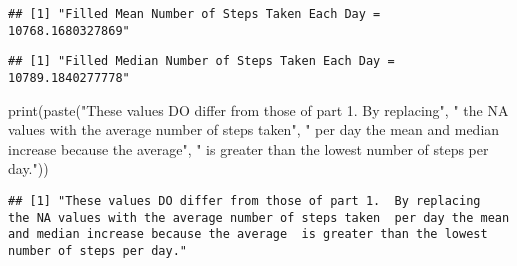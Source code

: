 \documentclass[
]{article}
\newenvironment{Shaded}{\begin{snugshade}}{\end{snugshade}}
\newcommand{\DocumentationTok}[1]{\textcolor[rgb]{0.56,0.35,0.01}{\textbf{\textit{#1}}}}
\newcommand{\FunctionTok}[1]{\textcolor[rgb]{0.00,0.00,0.00}{#1}}
\newcommand{\NormalTok}[1]{#1}
\newcommand{\SpecialCharTok}[1]{\textcolor[rgb]{0.00,0.00,0.00}{#1}}
\newcommand{\StringTok}[1]{\textcolor[rgb]{0.31,0.60,0.02}{#1}}
\begin{document}
\begin{Shaded}
\end{Shaded}

\begin{verbatim}
## [1] "Filled Mean Number of Steps Taken Each Day =  10768.1680327869"
\end{verbatim}

\begin{Shaded}
\end{Shaded}

\begin{verbatim}
## [1] "Filled Median Number of Steps Taken Each Day =  10789.1840277778"
\end{verbatim}

\begin{Shaded}
\begin{Highlighting}[]
\FunctionTok{print}\NormalTok{(}\FunctionTok{paste}\NormalTok{(}\StringTok{"These values DO differ from those of part 1.  By replacing"}\NormalTok{,}
            \StringTok{" the NA values with the average number of steps taken"}\NormalTok{,}
            \StringTok{" per day the mean and median increase because the average"}\NormalTok{,}
            \StringTok{" is greater than the lowest number of steps per day."}\NormalTok{))}
\end{Highlighting}
\end{Shaded}

\begin{verbatim}
## [1] "These values DO differ from those of part 1.  By replacing  the NA values with the average number of steps taken  per day the mean and median increase because the average  is greater than the lowest number of steps per day."
\end{verbatim}
\end{document}
